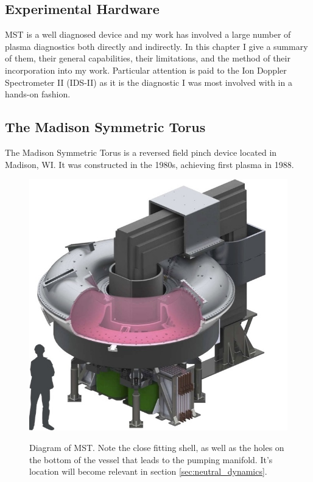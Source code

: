 \begin{refsection}
\chapter{Experimental Hardware}

MST is a well diagnosed device and my work has involved a large number of plasma diagnostics both directly and indirectly. In this chapter I give a summary of them, their general capabilities, their limitations, and the method of their incorporation into my work. Particular attention is paid to the Ion Doppler Spectrometer II (IDS-II) as it is the diagnostic I was most involved with in a hands-on fashion.

\section{The Madison Symmetric Torus}\label{sec:MST}
The Madison Symmetric Torus is a reversed field pinch device located in Madison, WI. It was constructed in the 1980s, achieving first plasma in 1988.
\begin{figure}[!htb]
	\centering
	\includegraphics{./2_Experimental_hardware/MST_model_diagram}
	\label{fig:MST_diagram}
	\caption[Diagram of MST]{Diagram of MST. Note the close fitting shell, as well as the holes on the bottom of the vessel that leads to the pumping manifold. It's location will become relevant in section \ref{sec:neutral_dynamics}.}
\end{figure}


\end{refsection}
